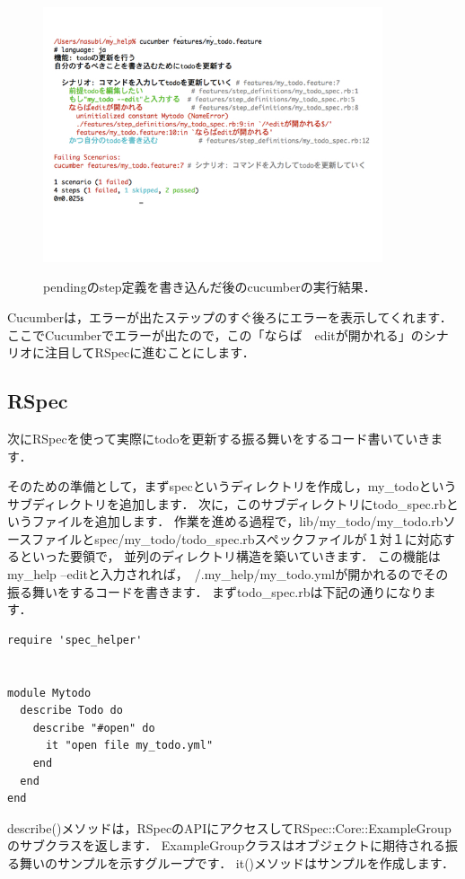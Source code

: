 \begin{figure}[htbp]\begin{center}
\includegraphics[width=10cm,bb= 0 0 737 553]{../figs/./cucumber03.001.jpg}
\caption{pendingのstep定義を書き込んだ後のcucumberの実行結果．}
\label{fig:cucumber03}
\label{default}\end{center}\end{figure}
Cucumberは，エラーが出たステップのすぐ後ろにエラーを表示してくれます．
ここでCucumberでエラーが出たので，この「ならば　editが開かれる」のシナリオに注目してRSpecに進むことにします．

\subsection{RSpec}
次にRSpecを使って実際にtodoを更新する振る舞いをするコード書いていきます．

そのための準備として，まずspecというディレクトリを作成し，my\_todoというサブディレクトリを追加します．
次に，このサブディレクトリにtodo\_spec.rbというファイルを追加します．
作業を進める過程で，lib/my\_todo/my\_todo.rbソースファイルとspec/my\_todo/todo\_spec.rbスペックファイルが１対１に対応するといった要領で，
並列のディレクトリ構造を築いていきます．
この機能はmy\_help --editと入力されれば，~/.my\_help/my\_todo.ymlが開かれるのでその振る舞いをするコードを書きます．
まずtodo\_spec.rbは下記の通りになります．
\begin{lstlisting}[style=customRuby,basicstyle={\scriptsize\ttfamily}]
require 'spec_helper'


module Mytodo
  describe Todo do
    describe "#open" do
      it "open file my_todo.yml" 
    end
  end
end

\end{lstlisting}
describe()メソッドは，RSpecのAPIにアクセスしてRSpec::Core::ExampleGroupのサブクラスを返します．
ExampleGroupクラスはオブジェクトに期待される振る舞いのサンプルを示すグループです．
it()メソッドはサンプルを作成します．

